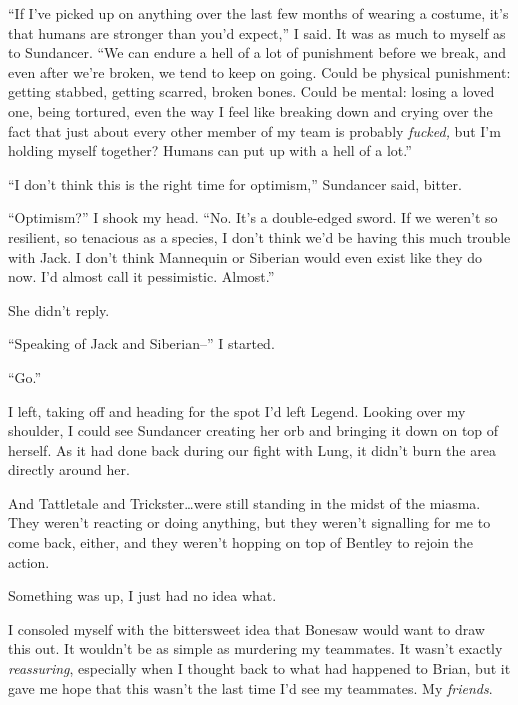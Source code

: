 ``If I've picked up on anything over the last few months of wearing a costume, it's that humans are stronger than you'd expect,'' I said.  It was as much to myself as to Sundancer.  ``We can endure a hell of a lot of punishment before we break, and even after we're broken, we tend to keep on going.  Could be physical punishment: getting stabbed, getting scarred, broken bones.  Could be mental: losing a loved one, being tortured, even the way I feel like breaking down and crying over the fact that just about every other member of my team is probably \emph{fucked, }but I'm holding myself together?  Humans can put up with a hell of a lot.''



``I don't think this is the right time for optimism,'' Sundancer said, bitter.



``Optimism?''  I shook my head.  ``No.  It's a double-edged sword.  If we weren't so resilient, so tenacious as a species, I don't think we'd be having this much trouble with Jack.  I don't think Mannequin or Siberian would even exist like they do now.  I'd almost call it pessimistic.  Almost.''



She didn't reply.



``Speaking of Jack and Siberian--'' I started.



``Go.''



I left, taking off and heading for the spot I'd left Legend.  Looking over my shoulder, I could see Sundancer creating her orb and bringing it down on top of herself.  As it had done back during our fight with Lung, it didn't burn the area directly around her.



And Tattletale and Trickster\ldots were still standing in the midst of the miasma.  They weren't reacting or doing anything, but they weren't signalling for me to come back, either, and they weren't hopping on top of Bentley to rejoin the action.



Something was up, I just had no idea what.



I consoled myself with the bittersweet idea that Bonesaw would want to draw this out.  It wouldn't be as simple as murdering my teammates.  It wasn't exactly \emph{reassuring}, especially when I thought back to what had happened to Brian, but it gave me hope that this wasn't the last time I'd see my teammates.  My \emph{friends}.



